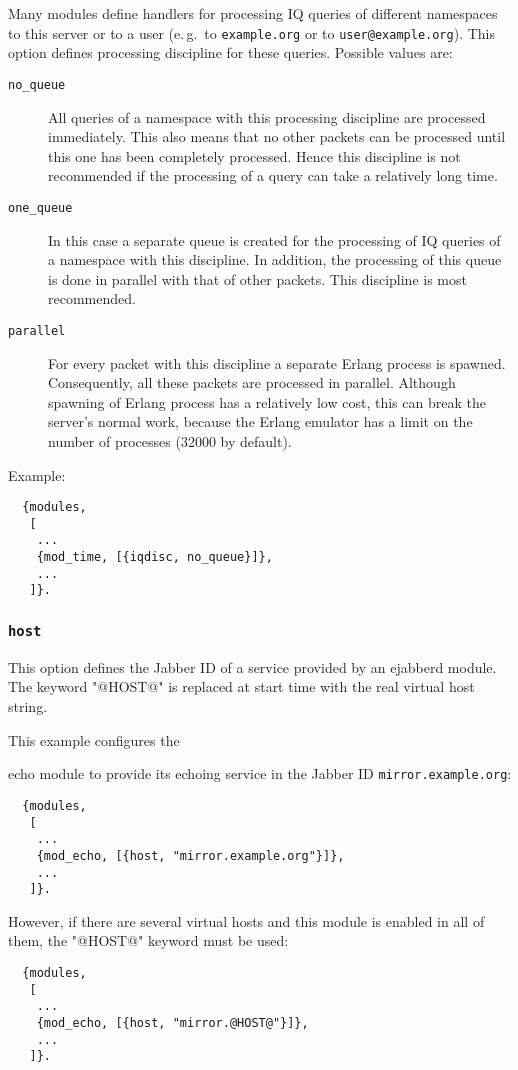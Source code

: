 \documentclass[a4paper,10pt]{book}
\newcommand{\ind}[1]{\begin{latexonly}\index{#1}\end{latexonly}}
\newcommand{\bracehack}{\def\{{\char"7B}\def\}{\char"7D}}
\newcommand{\titem}[1]{\item[\bracehack\texttt{#1}]}
\newcommand{\jid}[1]{\texttt{#1}}
\newcommand{\option}[1]{\texttt{#1}}
\newcommand{\module}[1]{\texttt{#1}}
\newcommand{\modecho}{\module{mod\_echo}}
\begin{document}
Many modules define handlers for processing IQ queries of different namespaces
to this server or to a user (e.\,g.\ to \jid{example.org} or to
\jid{user@example.org}). This option defines processing discipline for
these queries. Possible values are:
\begin{description}
\titem{no\_queue} All queries of a namespace with this processing discipline are
  processed immediately. This also means that no other packets can be processed
  until this one has been completely processed. Hence this discipline is not
  recommended if the processing of a query can take a relatively long time.
\titem{one\_queue} In this case a separate queue is created for the processing
  of IQ queries of a namespace with this discipline. In addition, the processing
  of this queue is done in parallel with that of other packets. This discipline
  is most recommended.
\titem{parallel} For every packet with this discipline a separate Erlang process
  is spawned. Consequently, all these packets are processed in parallel.
  Although spawning of Erlang process has a relatively low cost, this can break
  the server's normal work, because the Erlang emulator has a limit on the
  number of processes (32000 by default).
\end{description}

Example:
\begin{verbatim}
  {modules,
   [
    ...
    {mod_time, [{iqdisc, no_queue}]},
    ...
   ]}.
\end{verbatim}

\subsubsection{\option{host}}
\label{modhostoption}
\ind{options!host}

This option defines the Jabber ID of a service provided by an ejabberd module.
The keyword "@HOST@" is replaced at start time with the real virtual host string.

This example configures
the \ind{modules!\modecho{}}echo module to provide its echoing service 
in the Jabber ID \jid{mirror.example.org}:
    \begin{verbatim}
  {modules,
   [
    ...
    {mod_echo, [{host, "mirror.example.org"}]},
    ...
   ]}.
\end{verbatim}

However, if there are several virtual hosts and this module is enabled in all of them,
the "@HOST@" keyword must be used:
    \begin{verbatim}
  {modules,
   [
    ...
    {mod_echo, [{host, "mirror.@HOST@"}]},
    ...
   ]}.
\end{verbatim}
\end{document}
